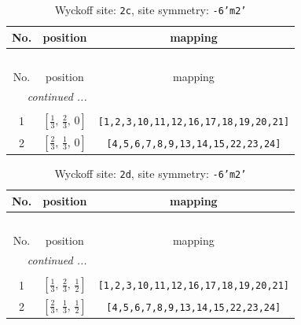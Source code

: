 \documentclass[fleqn,8pt]{jsarticle}
\begin{document}
\begin{longtable}{ccc}
\caption{Wyckoff site: {\tt 2c}, site symmetry: {\tt -6'm2'}}
 \\
 \hline \hline
No. & position & mapping \\ \hline \endfirsthead

\multicolumn{2}{l}{\tablename\ \thetable{}} \\
 \hline \hline
No. & position & mapping \\ \hline \endhead

 \hline \hline
\multicolumn{2}{r}{\footnotesize\it continued ...} \\ \endfoot

 \hline \hline
\multicolumn{2}{r}{} \\ \endlastfoot

1 & $\left[ \frac{1}{3},\, \frac{2}{3},\, 0 \right]$ & {\tt [1,2,3,10,11,12,16,17,18,19,20,21]} \\ \hline
2 & $\left[ \frac{2}{3},\, \frac{1}{3},\, 0 \right]$ & {\tt [4,5,6,7,8,9,13,14,15,22,23,24]} \\
\end{longtable}
\renewcommand{\arraystretch}{1.2}
\begin{longtable}{ccc}
\caption{Wyckoff site: {\tt 2d}, site symmetry: {\tt -6'm2'}}
 \\
 \hline \hline
No. & position & mapping \\ \hline \endfirsthead

\multicolumn{2}{l}{\tablename\ \thetable{}} \\
 \hline \hline
No. & position & mapping \\ \hline \endhead

 \hline \hline
\multicolumn{2}{r}{\footnotesize\it continued ...} \\ \endfoot

 \hline \hline
\multicolumn{2}{r}{} \\ \endlastfoot

1 & $\left[ \frac{1}{3},\, \frac{2}{3},\, \frac{1}{2} \right]$ & {\tt [1,2,3,10,11,12,16,17,18,19,20,21]} \\ \hline
2 & $\left[ \frac{2}{3},\, \frac{1}{3},\, \frac{1}{2} \right]$ & {\tt [4,5,6,7,8,9,13,14,15,22,23,24]} \\
\end{longtable}
\renewcommand{\arraystretch}{1.2}
\end{document}
